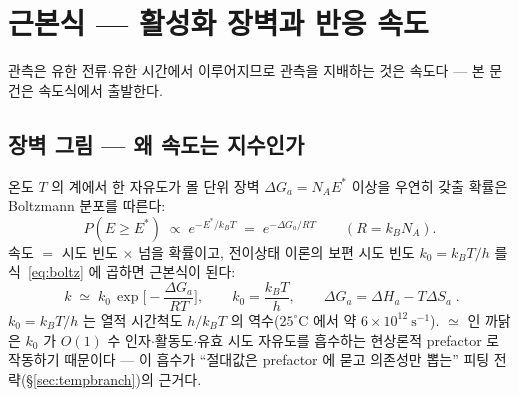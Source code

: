 \documentclass[11pt,a4paper]{article}
\begin{document}
\section{근본식 — 활성화 장벽과 반응 속도}\label{sec:rate}
관측은 유한 전류$\cdot$유한 시간에서 이루어지므로 관측을 지배하는 것은 속도다 — 본 문건은 속도식에서 출발한다.

\subsection{장벽 그림 — 왜 속도는 지수인가}
온도 $T$ 의 계에서 한 자유도가 몰 단위 장벽 $\Delta G_a=N_AE^*$ 이상을 우연히 갖출 확률은 Boltzmann 분포를 따른다:
\begin{equation}
P(E\ge E^*)\;\propto\;e^{-E^*/k_BT}
\;=\;e^{-\Delta G_a/RT}\qquad(R=k_BN_A).
\label{eq:boltz}
\end{equation}
속도 $=$ 시도 빈도 $\times$ 넘을 확률이고, 전이상태 이론의 보편 시도 빈도 $k_0=k_BT/h$ 를 식~\eqref{eq:boltz} 에 곱하면 \cite{eyring1935} 근본식이 된다:
\begin{equation}
\boxed{\;k\;\simeq\;k_0\,\exp\!\Big[-\frac{\Delta G_a}{RT}\Big],\qquad
k_0=\frac{k_BT}{h},\qquad \Delta G_a=\Delta H_a-T\Delta S_a\;.}
\label{eq:eyring}
\end{equation}
$k_0=k_BT/h$ 는 열적 시간척도 $h/k_BT$ 의 역수($25^\circ$C 에서 약 $6\times10^{12}\ \mathrm{s^{-1}}$). $\simeq$ 인 까닭은 $k_0$ 가 $O(1)$ 수 인자$\cdot$활동도$\cdot$유효 시도 자유도를 흡수하는 현상론적 prefactor 로 작동하기 때문이다 — 이 흡수가 ``절대값은 prefactor 에 묻고 의존성만 뽑는'' 피팅 전략(\S\ref{sec:tempbranch})의 근거다.
\end{document}
